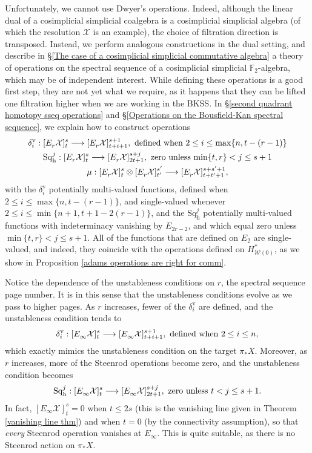 \documentclass[11pt]{amsart} \renewcommand{\baselinestretch}{1.2}
\theoremstyle{plain}
\numberwithin{equation}{section} %
\theoremstyle{plain}
\numberwithin{equation}{chapter} %
\renewcommand{\to}{\longrightarrow}
\newcommand{\calw}{\mathcal{W}}
\newcommand{\calx}{\mathcal{X}}
\newcommand{\F}{\mathbb{F}}
\newcommand{\Edownup}[5]{[E_{#1}^{#2}#3]^{#4}_{#5}}
\newcommand{\uver}{^\mathrm{v}}
\newcommand{\dhor}{_\mathrm{h}}
\newcommand{\Sqh}{\mathrm{Sq}\dhor}
\newcommand{\deltav}{\delta\uver}
\newcommand{\BKSS}{BKSS}
\begin{document}
\begin{Introduction}
Unfortunately, we cannot use Dwyer's operations. Indeed,  although the linear dual of a cosimplicial simplicial coalgebra is a cosimplicial simplicial algebra (of which the resolution $\calx$ is an example), the choice of filtration direction is transposed. Instead, we perform analogous constructions in the dual setting, and describe in \S\ref{The case of a cosimplicial simplicial commutative algebra} a theory of operations on the spectral sequence of a cosimplicial simplicial $\F_2$-algebra, which may be of independent interest. While defining these operations is a good first step, they are not yet what we require, as it happens that they can be lifted one filtration higher  when we are working in the \BKSS. In \S\ref{second quadrant homotopy sseq operations} and \S\ref{Operations on the Bousfield-Kan spectral sequence}, we explain how to construct operations
\begin{gather*}
\deltav_i:\Edownup{r}{}{\calx}{s}{t} \to \Edownup{r}{}{\calx}{s+1}{t+i+1},\textup{ defined when $2\leq i\leq \max\{n,t-(r-1)\}$}
\\
\Sqh^j:\Edownup{r}{}{\calx}{s}{t}   \to
\Edownup{r}{}{\calx}{s+j}{2t+1},\textup{ zero unless $\min\{t,r\}< j\leq s+1$}\\
\mu:\Edownup{r}{}{\calx}{s}{t}\otimes \Edownup{r}{}{\calx}{s'}{t'}\to
\Edownup{r}{}{\calx}{s+s'+1}{t+t'+1},
\end{gather*}
with the $\deltav_i$ potentially multi-valued functions,  defined when $2\leq i\leq \max\{n,t-(r-1)\}$, and single-valued whenever $2\leq i\leq\min\{n+1,t+1-2(r-1)\}$, and the $\Sqh^j$ potentially multi-valued functions with indeterminacy vanishing by $E_{2r-2}$, and which equal zero unless $\min\{t,r\}< j\leq s+1$. All of the functions that are  defined on $E_2$ are single-valued, and indeed, they coincide with the operations defined on $H^*_{\calw(0)}$, as we show in Proposition \ref{adams operations are right for comm}.

Notice the dependence of the unstableness conditions on $r$, the spectral sequence page number. It is in this sense that the unstableness conditions evolve as we pass to higher pages. As $r$ increases, fewer of the $\deltav_i$ are defined, and the unstableness condition tends to
\[\deltav_i:\Edownup{\infty}{}{\calx}{s}{t} \to \Edownup{\infty}{}{\calx}{s+1}{t+i+1},\textup{ defined when $2\leq i\leq n$},\]
which exactly mimics the unstableness condition on the target $\pi_*X$. Moreover, as $r$ increases, more of the Steenrod operations become zero, and the unstableness condition becomes
\[\Sqh^j:\Edownup{\infty}{}{\calx}{s}{t}   \to
\Edownup{\infty}{}{\calx}{s+j}{2t+1},\textup{ zero unless $t< j\leq s+1$}.\]
In fact, $\Edownup{\infty}{}{\calx}{s}{t}=0$ when $t\leq 2s$ (this is the vanishing line given in Theorem \ref{vanishing line thm}) and when $t=0$ (by the connectivity assumption), so that \emph{every} Steenrod operation vanishes at $E_\infty$. This is quite suitable, as there is no Steenrod action on $\pi_*X$.


\end{Introduction}
\end{document}
